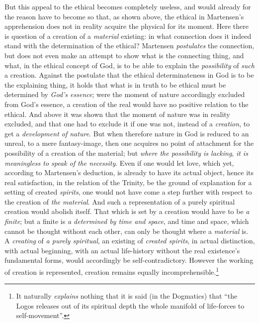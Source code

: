 \documentclass[12pt,a4paper]{book}
\begin{document}
But this appeal to the ethical becomes completely useless, and would already for the reason
have to become so that, as shown above, the ethical in Martensen's apprehension does not in
reality acquire the physical for its moment. Here there is question of a creation of a
\emph{material} existing: in what connection does it indeed stand with the determination of the
ethical? Martensen \emph{postulates} the connection, but does not even make an attempt to show what
is the connecting thing, and what, in the ethical concept of God, is to be able to explain
the \emph{possibility} of \emph{such} a creation. Against the postulate that the ethical determinateness in
God is to be the explaining thing, it holds that what is in truth to be ethical must be
determined by \emph{God's essence}; were the moment of nature accordingly excluded from God's essence,
a creation of the real would have no positive relation to the ethical. And above it was shown
that the moment of nature was in reality excluded, and that one had to exclude it if one was
not, instead of a \emph{creation}, to get a \emph{development of nature}. But when therefore nature in God
is reduced to an unreal, to a mere fantasy-image, then one acquires no point of attachment for
the possibility of a creation of the material; but \emph{where the possibility is lacking}, \emph{it is
meaningless to speak of the necessity}. Even if one would let love, which yet, according to
Martensen's deduction, is already to have its actual object, hence its real satisfaction, in
the relation of the Trinity, be the ground of explanation for a setting of created \emph{spirits},
one would not have come a step further with respect to the creation of \emph{the material}. And such
a representation of a purely spiritual creation would abolish itself. That which is set by a
creation would have to be \emph{a finite}; but a finite is \emph{a determined by time and space}, and time
and space, which cannot be thought without each other, can only be thought where a \emph{material}
is. A \emph{creating} of \emph{a purely spiritual}, an existing of \emph{created spirits}, in actual distinction,
with actual beginning, with an actual life-history without the real existence's fundamental
forms, would accordingly be self-contradictory. However the working of creation is
represented, creation remains equally incomprehensible.\footnote{It naturally \emph{explains} nothing
that it is said (in the Dogmatics) that ``the Logos releases out of its spiritual depth the
whole manifold of life-forces to self-movement''.}
\end{document}
